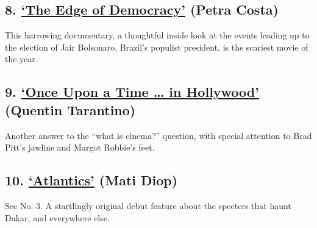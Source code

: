 \hypertarget{8-the-edge-of-democracy-petra-costa}{%
\subsection{\texorpdfstring{8.
\href{https://www.nytimes.com/2019/06/18/movies/edge-of-democracy-review.html}{`The
Edge of Democracy'} (Petra
Costa)}{8. `The Edge of Democracy' (Petra Costa)}}\label{8-the-edge-of-democracy-petra-costa}}

This harrowing documentary, a thoughtful inside look at the events
leading up to the election of Jair Bolsonaro, Brazil's populist
president, is the scariest movie of the year.

\hypertarget{9-once-upon-a-time--in-hollywood-quentin-tarantino}{%
\subsection{\texorpdfstring{9.
\href{https://www.nytimes.com/2019/07/24/movies/once-upon-a-time-in-hollywood-review.html}{`Once
Upon a Time \ldots{} in Hollywood'} (Quentin
Tarantino)}{9. `Once Upon a Time \ldots{} in Hollywood' (Quentin Tarantino)}}\label{9-once-upon-a-time--in-hollywood-quentin-tarantino}}

Another answer to the ``what is cinema?'' question, with special
attention to Brad Pitt's jawline and Margot Robbie's feet.

\hypertarget{10-atlantics-mati-diop}{%
\subsection{\texorpdfstring{10.
\href{https://www.nytimes.com/2019/11/14/movies/atlantics-review.html}{`Atlantics'}
(Mati
Diop)}{10. `Atlantics' (Mati Diop)}}\label{10-atlantics-mati-diop}}

See No. 3. A startlingly original debut feature about the specters that
haunt Dakar, and everywhere else.

